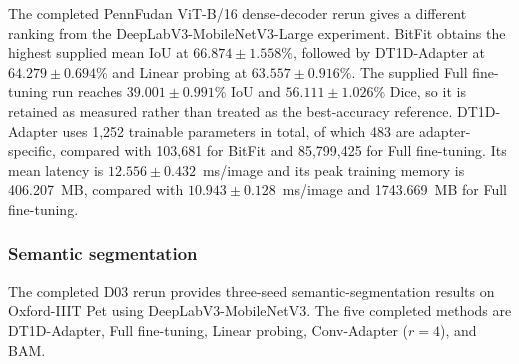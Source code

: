 \documentclass[pdflatex,sn-mathphys-num]{sn-jnl}
\theoremstyle{thmstyleone}
\theoremstyle{thmstyletwo}
\theoremstyle{thmstylethree}
\begin{document}
The completed PennFudan ViT-B/16 dense-decoder rerun gives a different ranking from the DeepLabV3-MobileNetV3-Large experiment. BitFit obtains the highest supplied mean IoU at $66.874\pm1.558\%$, followed by DT1D-Adapter at $64.279\pm0.694\%$ and Linear probing at $63.557\pm0.916\%$. The supplied Full fine-tuning run reaches $39.001\pm0.991\%$ IoU and $56.111\pm1.026\%$ Dice, so it is retained as measured rather than treated as the best-accuracy reference. DT1D-Adapter uses 1,252 trainable parameters in total, of which 483 are adapter-specific, compared with 103,681 for BitFit and 85,799,425 for Full fine-tuning. Its mean latency is $12.556\pm0.432$~ms/image and its peak training memory is 406.207~MB, compared with $10.943\pm0.128$~ms/image and 1743.669~MB for Full fine-tuning.


\subsubsection{Semantic segmentation}

The completed D03 rerun provides three-seed semantic-segmentation results on Oxford-IIIT Pet using DeepLabV3-MobileNetV3. The five completed methods are DT1D-Adapter, Full fine-tuning, Linear probing, Conv-Adapter ($r=4$), and BAM.
\end{document}
